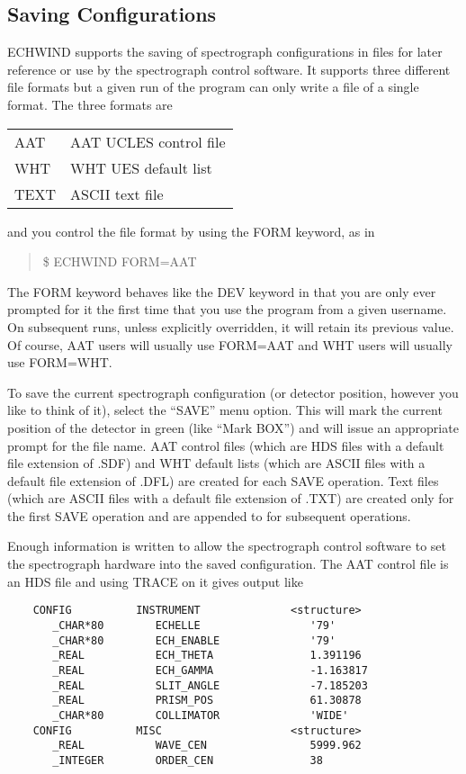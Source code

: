 \subsection{Saving Configurations}

ECHWIND supports the saving of spectrograph configurations in files for later
reference or use by the spectrograph control software. It supports three
different file formats but a given run of the program can only write a file of
a single format. The three formats are

\begin{tabular}{ll}
AAT	& AAT UCLES control file \\
WHT	& WHT UES default list \\
TEXT	& ASCII text file
\end{tabular}

and you control the file format by using the FORM keyword, as in
\begin{quote}
\$ ECHWIND FORM=AAT
\end{quote}

The FORM keyword behaves like the DEV keyword in that you are only ever
prompted for it the first time that you use the program from a given username.
On subsequent runs, unless explicitly overridden, it will retain its previous
value. Of course, AAT users will usually use FORM=AAT and WHT users will
usually use FORM=WHT.

To save the current spectrograph configuration (or detector position, however
you like to think of it), select the ``SAVE'' menu option. This will mark the
current position of the detector in green (like ``Mark BOX'') and will issue an
appropriate prompt for the file name. AAT control files (which are HDS files
with a default file extension of .SDF) and WHT default lists (which are ASCII
files with a default file extension of .DFL) are created for each SAVE
operation. Text files (which are ASCII files with a default file extension of
.TXT) are created only for the first SAVE operation and are appended to for
subsequent operations.

Enough information is written to allow the spectrograph control software to
set the spectrograph hardware into the saved configuration. The AAT control
file is an HDS file and using TRACE on it gives output like
\begin{verbatim}
    CONFIG          INSTRUMENT              <structure>
       _CHAR*80        ECHELLE                 '79'
       _CHAR*80        ECH_ENABLE              '79'
       _REAL           ECH_THETA               1.391196
       _REAL           ECH_GAMMA               -1.163817
       _REAL           SLIT_ANGLE              -7.185203
       _REAL           PRISM_POS               61.30878
       _CHAR*80        COLLIMATOR              'WIDE'
    CONFIG          MISC                    <structure>
       _REAL           WAVE_CEN                5999.962
       _INTEGER        ORDER_CEN               38
\end{verbatim}

